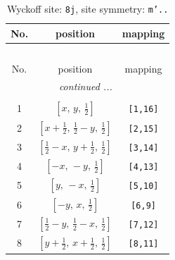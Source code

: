 \documentclass[fleqn,8pt]{jsarticle}
\begin{document}
\begin{longtable}{ccc}
\caption{Wyckoff site: {\tt 8j}, site symmetry: {\tt m'..}}
 \\
 \hline \hline
No. & position & mapping \\ \hline \endfirsthead

\multicolumn{2}{l}{\tablename\ \thetable{}} \\
 \hline \hline
No. & position & mapping \\ \hline \endhead

 \hline \hline
\multicolumn{2}{r}{\footnotesize\it continued ...} \\ \endfoot

 \hline \hline
\multicolumn{2}{r}{} \\ \endlastfoot

1 & $\left[ x,\, y,\, \frac{1}{2} \right]$ & {\tt [1,16]} \\ \hline
2 & $\left[ x + \frac{1}{2},\, \frac{1}{2} - y,\, \frac{1}{2} \right]$ & {\tt [2,15]} \\ \hline
3 & $\left[ \frac{1}{2} - x,\, y + \frac{1}{2},\, \frac{1}{2} \right]$ & {\tt [3,14]} \\ \hline
4 & $\left[ - x,\, - y,\, \frac{1}{2} \right]$ & {\tt [4,13]} \\ \hline
5 & $\left[ y,\, - x,\, \frac{1}{2} \right]$ & {\tt [5,10]} \\ \hline
6 & $\left[ - y,\, x,\, \frac{1}{2} \right]$ & {\tt [6,9]} \\ \hline
7 & $\left[ \frac{1}{2} - y,\, \frac{1}{2} - x,\, \frac{1}{2} \right]$ & {\tt [7,12]} \\ \hline
8 & $\left[ y + \frac{1}{2},\, x + \frac{1}{2},\, \frac{1}{2} \right]$ & {\tt [8,11]} \\
\end{longtable}
\renewcommand{\arraystretch}{1.2}
\end{document}
